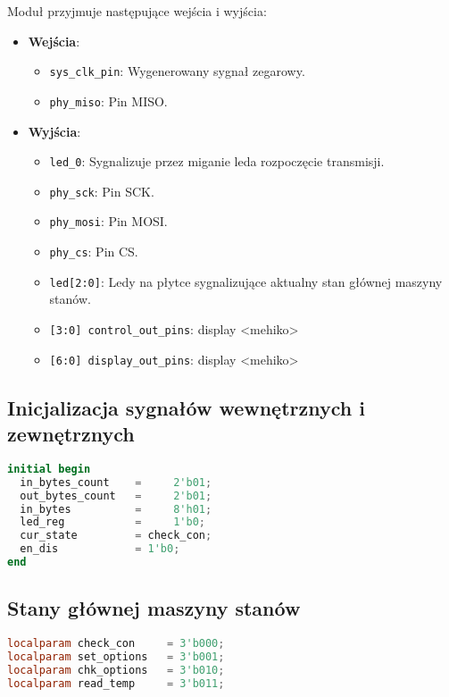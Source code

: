 \documentclass[a4paper,12pt]{article}
\begin{document}
Moduł przyjmuje następujące wejścia i wyjścia:
\begin{itemize}
    \item \textbf{Wejścia}:
    \begin{itemize}
        \item \texttt{sys\_clk\_pin}: Wygenerowany sygnał zegarowy.
        \item \texttt{phy\_miso}: Pin MISO.
    \end{itemize}
    \item \textbf{Wyjścia}:
    \begin{itemize}
        \item \texttt{led\_0}: Sygnalizuje przez miganie leda rozpoczęcie transmisji.
        \item \texttt{phy\_sck}: Pin SCK.
        \item \texttt{phy\_mosi}: Pin MOSI.
        \item \texttt{phy\_cs}: Pin CS.
        \item \texttt{led[2:0]}: Ledy na płytce sygnalizujące aktualny stan głównej maszyny stanów.

        \item \texttt{[3:0] control\_out\_pins}: display <mehiko>
        \item \texttt{[6:0] display\_out\_pins}: display <mehiko>
    \end{itemize}
\end{itemize}

\subsection*{Inicjalizacja sygnałów wewnętrznych i zewnętrznych}

\begin{lstlisting}[language=verilog]
initial begin
  in_bytes_count    =     2'b01;
  out_bytes_count   =     2'b01;
  in_bytes          =     8'h01;
  led_reg           =     1'b0;
  cur_state         = check_con;
  en_dis            = 1'b0;
end
\end{lstlisting}

\subsection*{Stany głównej maszyny stanów}

\begin{lstlisting}[language=verilog]
localparam check_con     = 3'b000;
localparam set_options   = 3'b001;
localparam chk_options   = 3'b010;
localparam read_temp     = 3'b011;
\end{lstlisting}
\end{document}
